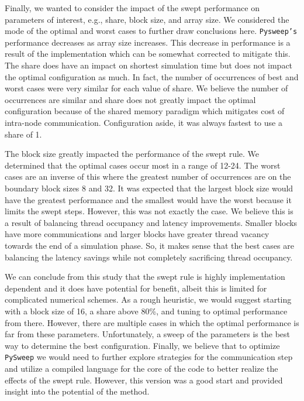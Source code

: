 \documentclass[journal,article,submit,moreauthors,pdftex]{Definitions/mdpi}
\def\pysweep{\texttt{PySweep}}
\begin{document}
\begin{paracol}{2}
Finally, we wanted to consider the impact of the swept performance on parameters of interest, e.g., share, block size, and array size. We considered the mode of the optimal and worst cases to further draw conclusions here. \texttt{Pysweep's} performance decreases as array size increases. This decrease in performance is a result of the implementation which can be somewhat corrected to mitigate this. The share does have an impact on shortest simulation time but does not impact the optimal configuration as much. In fact, the number of occurrences of best and worst cases were very similar for each value of share. We believe the number of occurrences are similar and share does not greatly impact the optimal configuration because of the shared memory paradigm which mitigates cost of intra-node communication. 
Configuration aside, it was always fastest to use a share of 1.

The block size greatly impacted the performance of the swept rule. We determined that the optimal cases occur most in a range of 12-24. The worst cases are an inverse of this where the greatest number of occurrences are on the boundary block sizes 8 and 32. It was expected that the largest block size would have the greatest performance and the smallest would have the worst because it limits the swept steps. However, this was not exactly the case. We believe this is a result of balancing thread occupancy and latency improvements. Smaller blocks have more communications and larger blocks have greater thread vacancy towards the end of a simulation phase. So, it makes sense that the best cases are balancing the latency savings while not completely sacrificing thread occupancy. 

We can conclude from this study that the swept rule is highly implementation dependent and it does have potential for benefit, albeit this is limited for complicated numerical schemes. As a rough heuristic, we would suggest starting with a block size of 16, a share above 80\%, and tuning to optimal performance from there. However, there are multiple cases in which the optimal performance is far from these parameters. Unfortunately, a sweep of the parameters is the best way to determine the best configuration. Finally, we believe that to optimize \pysweep{} we would need to further explore strategies for the communication step and utilize a compiled language for the core of the code to better realize the effects of the swept rule. However, this version was a good start and provided insight into the potential of the method. 


\end{paracol}
\end{document}
